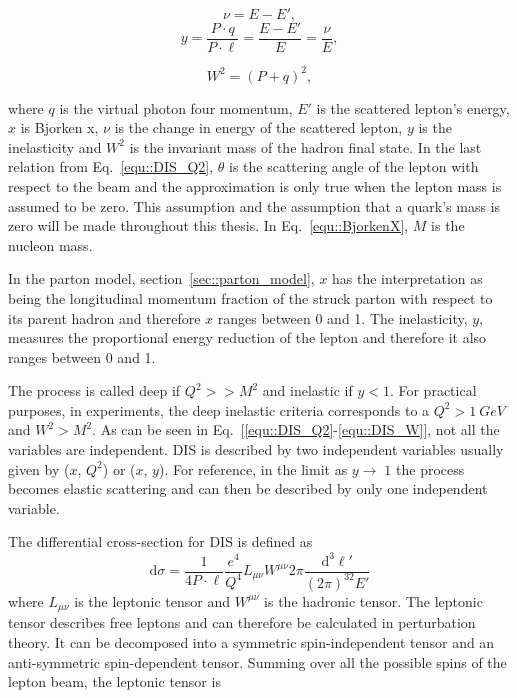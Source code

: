 \begin{multicols}{2}
  \noindent
  \begin{equation}
    \nu = E - E',
  \end{equation} 
  \begin{equation}
    \label{equ::inelasticity}
    y = \frac{P \cdot q}{P \cdot \ell} = \frac{E - E'}{E} = \frac{\nu}{E},
  \end{equation} 
\end{multicols}

\begin{multicols}{2}
  \noindent
  \begin{equation}
    \label{equ::DIS_W}
    W^2 = (P+q)^2,
  \end{equation}
\end{multicols}

\noindent
where $q$ is the virtual photon four momentum, $E'$ is the scattered lepton's
energy, $x$ is Bjorken x, $\nu$ is the change in energy of the scattered lepton,
$y$ is the inelasticity and $W^2$ is the invariant mass of the hadron final
state.  In the last relation from Eq.~\ref{equ::DIS_Q2}, $\theta$ is the
scattering angle of the lepton with respect to the beam and the approximation is
only true when the lepton mass is assumed to be zero.  This assumption and the
assumption that a quark's mass is zero will be made throughout this thesis.  In
Eq.~\ref{equ::BjorkenX}, $M$ is the nucleon mass.

In the parton model, section~\ref{sec::parton_model}, $x$ has the interpretation
as being the longitudinal momentum fraction of the struck parton with respect to
its parent hadron and therefore $x$ ranges between 0 and 1.  The inelasticity,
$y$, measures the proportional energy reduction of the lepton and therefore it
also ranges between 0 and 1.

The process is called deep if $Q^2 >> M^2$ and inelastic if $y < 1$.  For
practical purposes, in experiments, the deep inelastic criteria corresponds to a
$Q^2 > 1~GeV$ and $W^2 > M^2$.  As can be seen in
Eq.~[\ref{equ::DIS_Q2}-\ref{equ::DIS_W}], not all the variables are independent.
DIS is described by two independent variables usually given by ($x$, $Q^2$) or
($x$, $y$).  For reference, in the limit as $y \to \; 1$ the process becomes
elastic scattering and can then be described by only one independent variable.

The differential cross-section for DIS is defined as~\cite{Barone:2001sp}
\begin{equation}
  \label{equ::DIS_xsection}
  \mathrm{d}\sigma =
  \frac{1}{4P\cdot \ell}\frac{e^4}{Q^4} L_{\mu\nu}W^{\mu\nu}
  2\pi\frac{\mathrm{d}^3\ell'}{(2\pi)^32E'}
\end{equation}
\noindent
where $L_{\mu\nu}$ is the leptonic tensor and $W^{\mu\nu}$ is the hadronic
tensor.  The leptonic tensor describes free leptons and can therefore be
calculated in perturbation theory.  It can be decomposed into a symmetric
spin-independent tensor and an anti-symmetric spin-dependent tensor.  Summing
over all the possible spins of the lepton beam, the leptonic tensor is

